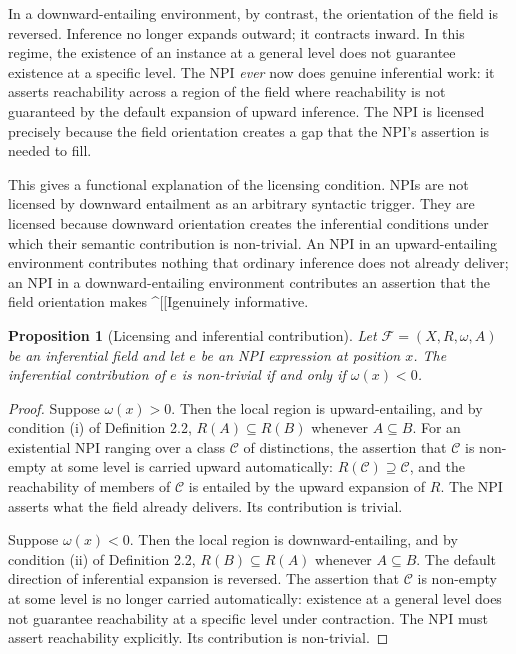 \documentclass[12pt]{article}
\newtheorem{proposition}[theorem]{Proposition}
\theoremstyle{remark}
\begin{document}
In a downward-entailing environment, by contrast, the orientation of
the field is reversed. Inference no longer expands outward; it contracts
inward. In this regime, the existence of an instance at a general level
does not guarantee existence at a specific level. The NPI \emph{ever}
now does genuine inferential work: it asserts reachability across a
region of the field where reachability is not guaranteed by the default
expansion of upward inference. The NPI is licensed precisely because the
field orientation creates a gap that the NPI's assertion is needed to
fill.

This gives a functional explanation of the licensing condition. NPIs are
not licensed by downward entailment as an arbitrary syntactic trigger.
They are licensed because downward orientation creates the inferential
conditions under which their semantic contribution is non-trivial. An
NPI in an upward-entailing environment contributes nothing that ordinary
inference does not already deliver; an NPI in a downward-entailing
environment contributes an assertion that the field orientation makes
^[[Igenuinely informative.

\begin{proposition}[Licensing and inferential contribution]
\label{prop:npi-contrib}
Let $\mathcal{F} = (X, R, \omega, A)$ be an inferential field and let
$e$ be an NPI expression at position $x$. The inferential contribution
of $e$ is non-trivial if and only if $\omega(x) < 0$.
\end{proposition}

\begin{proof}
Suppose $\omega(x) > 0$. Then the local region is upward-entailing, and
by condition (i) of Definition 2.2, $R(A) \subseteq R(B)$ whenever $A
\subseteq B$. For an existential NPI ranging over a class $\mathcal{C}$
of distinctions, the assertion that $\mathcal{C}$ is non-empty at some
level is carried upward automatically: $R(\mathcal{C}) \supseteq
\mathcal{C}$, and the reachability of members of $\mathcal{C}$ is
entailed by the upward expansion of $R$. The NPI asserts what the field
already delivers. Its contribution is trivial.

Suppose $\omega(x) < 0$. Then the local region is downward-entailing,
and by condition (ii) of Definition 2.2, $R(B) \subseteq R(A)$ whenever
$A \subseteq B$. The default direction of inferential expansion is
reversed. The assertion that $\mathcal{C}$ is non-empty at some level
is no longer carried automatically: existence at a general level does
not guarantee reachability at a specific level under contraction.
The NPI must assert reachability explicitly. Its contribution is
non-trivial.
\end{proof}
\end{document}
